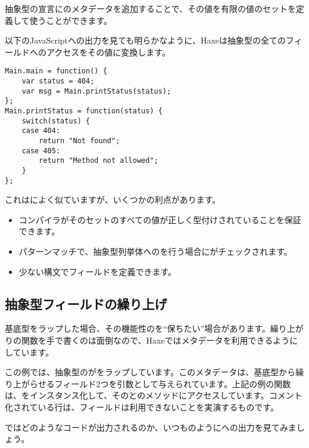 抽象型の宣言にのメタデータを追加することで、その値を有限の値のセットを定義して使うことができます。



以下のJavaScriptへの出力を見ても明らかなように、Haxeは抽象型の全てのフィールドへのアクセスをその値に変換します。

\begin{lstlisting}
Main.main = function() {
	var status = 404;
	var msg = Main.printStatus(status);
};
Main.printStatus = function(status) {
	switch(status) {
	case 404:
		return "Not found";
	case 405:
		return "Method not allowed";
	}
};
\end{lstlisting}

これはによく似ていますが、いくつかの利点があります。

\begin{itemize}
	\item コンパイラがそのセットのすべての値が正しく型付けされていることを保証できます。
	\item パターンマッチで、抽象型列挙体へのを行う場合にがチェックされます。
	\item 少ない構文でフィールドを定義できます。
\end{itemize}


\subsection{抽象型フィールドの繰り上げ}
\label{types-abstract-forward}

基底型をラップした場合、その機能性のを``保ちたい''場合があります。繰り上がりの関数を手で書くのは面倒なので、Haxeではメタデータを利用できるようにしています。


この例では、抽象型のがをラップしています。このメタデータは、基底型から繰り上がらせるフィールド2つを引数として与えられています。上記の例の関数は、をインスタンス化して、そのとのメソッドにアクセスしています。コメント化されている行は、フィールドは利用できないことを実演するものです。

ではどのようなコードが出力されるのか、いつものようにへの出力を見てみましょう。

